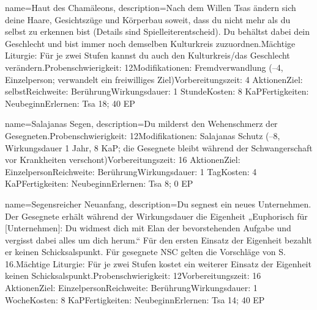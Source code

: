 {
    name={Haut des Chamäleons},
    description={Nach dem Willen Tsas ändern sich deine Haare, Gesichtszüge und Körperbau soweit, dass du nicht mehr als du selbst zu erkennen bist (Details sind Spielleiterentscheid). Du behältst dabei dein Geschlecht und bist immer noch demselben Kulturkreis zuzuordnen.\newline Mächtige Liturgie: Für je zwei Stufen kannst du auch den Kulturkreis/das Geschlecht verändern.\newline Probenschwierigkeit: 12\newline Modifikationen: Fremdverwandlung (–4, Einzelperson; verwandelt ein freiwilliges Ziel)\newline Vorbereitungszeit: 4 Aktionen\newline Ziel: selbst\newline Reichweite: Berührung\newline Wirkungsdauer: 1 Stunde\newline Kosten: 8 KaP\newline Fertigkeiten: Neubeginn\newline Erlernen: Tsa 18; 40 EP}
}


{
    name={Salajanas Segen},
    description={Du milderst den Wehenschmerz der Gesegneten.\newline Probenschwierigkeit: 12\newline Modifikationen: Salajanas Schutz (–8, Wirkungsdauer 1 Jahr, 8 KaP; die Gesegnete bleibt während der Schwangerschaft vor Krankheiten verschont)\newline Vorbereitungszeit: 16 Aktionen\newline Ziel: Einzelperson\newline Reichweite: Berührung\newline Wirkungsdauer: 1 Tag\newline Kosten: 4 KaP\newline Fertigkeiten: Neubeginn\newline Erlernen: Tsa 8; 0 EP}
}


{
    name={Segensreicher Neuanfang},
    description={Du segnest ein neues Unternehmen. Der Gesegnete erhält während der Wirkungsdauer die Eigenheit „Euphorisch für [Unternehmen]: Du widmest dich mit Elan der bevorstehenden Aufgabe und vergisst dabei alles um dich herum.“ Für den ersten Einsatz der Eigenheit bezahlt er keinen Schicksalspunkt. Für gesegnete NSC gelten die Vorschläge von S. 16.\newline Mächtige Liturgie: Für je zwei Stufen kostet ein weiterer Einsatz der Eigenheit keinen Schicksalspunkt.\newline Probenschwierigkeit: 12\newline Vorbereitungszeit: 16 Aktionen\newline Ziel: Einzelperson\newline Reichweite: Berührung\newline Wirkungsdauer: 1 Woche\newline Kosten: 8 KaP\newline Fertigkeiten: Neubeginn\newline Erlernen: Tsa 14; 40 EP}
}


